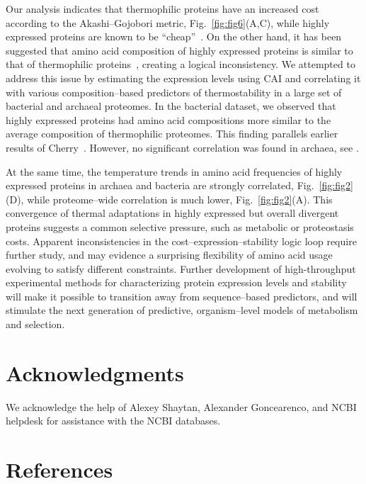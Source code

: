 \documentclass[10pt,letterpaper]{article}
\begin{document}
Our analysis indicates that thermophilic proteins have an increased cost according to the Akashi--Gojobori metric, Fig.~\ref{fig:fig6}(A,C), while highly expressed proteins are known to be ``cheap''~\cite{Akashi2002Metabolic}. On the other hand, it has been suggested that amino acid composition of highly expressed proteins is similar to that of thermophilic proteins~\cite{Cherry2010Highly}, creating a logical inconsistency. We attempted to address this issue by estimating the expression levels using CAI and correlating it with various composition--based predictors of thermostability in a large set of bacterial and archaeal proteomes. In the bacterial dataset, we observed that highly expressed proteins had amino acid compositions more similar to the average composition of thermophilic proteomes. This finding parallels earlier results of Cherry~\cite{Cherry2010Highly}. However, no significant correlation was found in archaea, see . 

At the same time, the temperature trends in amino acid frequencies of highly expressed proteins in archaea and bacteria are strongly correlated, Fig.~\ref{fig:fig2}(D), while proteome--wide correlation is much lower, Fig.~\ref{fig:fig2}(A). This convergence of thermal adaptations in highly expressed but overall divergent proteins suggests a common selective pressure, such as metabolic or proteostasis costs. Apparent inconsistencies in the cost--expression--stability logic loop require further study, and may evidence a surprising flexibility of amino acid usage evolving to satisfy different constraints. Further development of high-throughput experimental methods for characterizing protein expression levels and stability will make it possible to transition away from sequence--based predictors, and will stimulate the next generation of predictive, organism--level models of metabolism and selection.




\section*{Acknowledgments}
We acknowledge the help of Alexey Shaytan, Alexander Goncearenco, and NCBI helpdesk for assistance with the NCBI databases.


\section*{References}
%
%
% 
\end{document}
